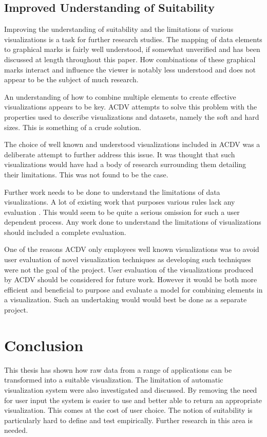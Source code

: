 \documentclass[a4paper, 11pt, titlepage, onehalfspacing]{report}
\begin{document}
\subsection{Improved Understanding of Suitability}
Improving the understanding of suitability and the limitations of various visualizations is a task for further research studies. The mapping of data elements to graphical marks is fairly well understood, if somewhat unverified and has been discussed at length throughout this paper. How combinations of these graphical marks interact and influence the viewer is notably less understood and does not appear to be the subject of much research.

An understanding of how to combine multiple elements to create effective visualizations appears to be key. AC\lightning{}DV attempts to solve this problem with the properties used to describe visualizations and datasets, namely the soft and hard sizes. This is something of a crude solution.

The choice of well known and understood visualizations included in AC\lightning{}DV was a deliberate attempt to further address this issue. It was thought that such visualizations would have had a body of research surrounding them detailing their limitations. This was not found to be the case.

Further work needs to be done to understand the limitations of data visualizations. A lot of existing work that purposes various rules lack any evaluation \cite{card1999readings} \cite{mazza2009introduction}. This would seem to be quite a serious omission for such a user dependent process. Any work done to understand the limitations of visualizations should included a complete evaluation.

One of the reasons AC\lightning{}DV only employees well known visualizations was to avoid user evaluation of novel visualization techniques as developing such techniques were not the goal of the project. User evaluation of the visualizations produced by AC\lightning{}DV should be considered for future work. However it would be both more efficient and beneficial to purpose and evaluate a model for combining elements in a visualization. Such an undertaking would would best be done as a separate project.

\section{Conclusion}
This thesis has shown how raw data from a range of applications can be transformed into a suitable visualization. The limitation of automatic visualization system were also investigated and discussed. By removing the need for user input the system is easier to use and better able to return an appropriate visualization. This comes at the cost of user choice. The notion of suitability is particularly hard to define and test empirically. Further research in this area is needed.
\end{document}
